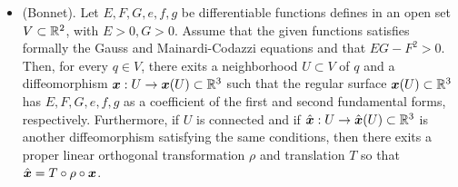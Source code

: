 \documentclass[11pt]{article}
\begin{document}
\begin{itemize}
\item 
\begin{theorem} \label{th: Bonnet_th}
(Bonnet). Let $E,F,G, e,f,g$ be differentiable functions defines in an open set $V\subset {\mathbb R}^{2}$, with $E>0, G>0$. Assume that the given functions satisfies formally the Gauss and Mainardi-Codazzi equations and that $EG-F^{2} >0$. Then, for every $q\in V$, there exits a neighborhood $U\subset V$  of $q$ and a diffeomorphism $\boldsymbol{x}: U \rightarrow \boldsymbol{x}(U)\subset {\mathbb R}^{3}$ such that the regular surface $ \boldsymbol{x}(U)\subset {\mathbb R}^{3}$ has $E,F,G,e,f,g$ as a coefficient of the first and second fundamental forms, respectively. Furthermore, if $U$ is connected and if $\hat{\boldsymbol{x}}: U \rightarrow \hat{\boldsymbol{x}}(U)\subset {\mathbb R}^{3}$ is another diffeomorphism satisfying the same conditions, then there exits a proper linear orthogonal transformation $\rho$ and translation $T$ so that $\hat{\boldsymbol{x}} = T \circ \rho \circ \boldsymbol{x}$. 
\end{theorem}
\end{itemize}
\end{document}
